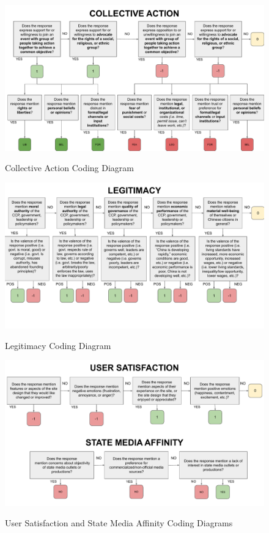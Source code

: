 \documentclass[11pt]{article}
\begin{document}
\begin{figure}[H]
  \centering
  \caption{Collective Action Coding Diagram}
  \vspace{1em}
  \includegraphics[width=\textwidth]{figures/coding_diagrams/collective_action.pdf}
  \label{collective_action}
\end{figure}

\begin{figure}[H]
  \centering
  \caption{Legitimacy Coding Diagram}
  \vspace{1em}
  \includegraphics[width=\textwidth]{figures/coding_diagrams/legitimacy.pdf}
  \label{legitimacy}
\end{figure}

\begin{figure}[H]
  \centering
  \caption{User Satisfaction and State Media Affinity Coding Diagrams}
  \vspace{1em}
  \includegraphics[width=\textwidth]{figures/coding_diagrams/user_sat_state_media.pdf}
  \label{user_sat_state_media}
\end{figure}
\end{document}
